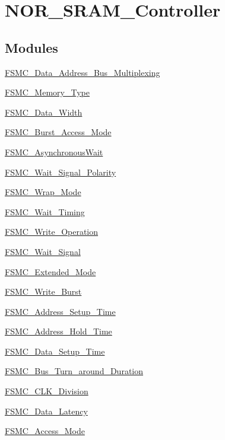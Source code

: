 \hypertarget{group__NOR__SRAM__Controller}{
\section{NOR\_\-SRAM\_\-Controller}
\label{group__NOR__SRAM__Controller}
}
\subsection*{Modules}
\begin{DoxyCompactItemize}
\item 
\hyperlink{group__FSMC__Data__Address__Bus__Multiplexing}{FSMC\_\-Data\_\-Address\_\-Bus\_\-Multiplexing}
\item 
\hyperlink{group__FSMC__Memory__Type}{FSMC\_\-Memory\_\-Type}
\item 
\hyperlink{group__FSMC__Data__Width}{FSMC\_\-Data\_\-Width}
\item 
\hyperlink{group__FSMC__Burst__Access__Mode}{FSMC\_\-Burst\_\-Access\_\-Mode}
\item 
\hyperlink{group__FSMC__AsynchronousWait}{FSMC\_\-AsynchronousWait}
\item 
\hyperlink{group__FSMC__Wait__Signal__Polarity}{FSMC\_\-Wait\_\-Signal\_\-Polarity}
\item 
\hyperlink{group__FSMC__Wrap__Mode}{FSMC\_\-Wrap\_\-Mode}
\item 
\hyperlink{group__FSMC__Wait__Timing}{FSMC\_\-Wait\_\-Timing}
\item 
\hyperlink{group__FSMC__Write__Operation}{FSMC\_\-Write\_\-Operation}
\item 
\hyperlink{group__FSMC__Wait__Signal}{FSMC\_\-Wait\_\-Signal}
\item 
\hyperlink{group__FSMC__Extended__Mode}{FSMC\_\-Extended\_\-Mode}
\item 
\hyperlink{group__FSMC__Write__Burst}{FSMC\_\-Write\_\-Burst}
\item 
\hyperlink{group__FSMC__Address__Setup__Time}{FSMC\_\-Address\_\-Setup\_\-Time}
\item 
\hyperlink{group__FSMC__Address__Hold__Time}{FSMC\_\-Address\_\-Hold\_\-Time}
\item 
\hyperlink{group__FSMC__Data__Setup__Time}{FSMC\_\-Data\_\-Setup\_\-Time}
\item 
\hyperlink{group__FSMC__Bus__Turn__around__Duration}{FSMC\_\-Bus\_\-Turn\_\-around\_\-Duration}
\item 
\hyperlink{group__FSMC__CLK__Division}{FSMC\_\-CLK\_\-Division}
\item 
\hyperlink{group__FSMC__Data__Latency}{FSMC\_\-Data\_\-Latency}
\item 
\hyperlink{group__FSMC__Access__Mode}{FSMC\_\-Access\_\-Mode}
\end{DoxyCompactItemize}
